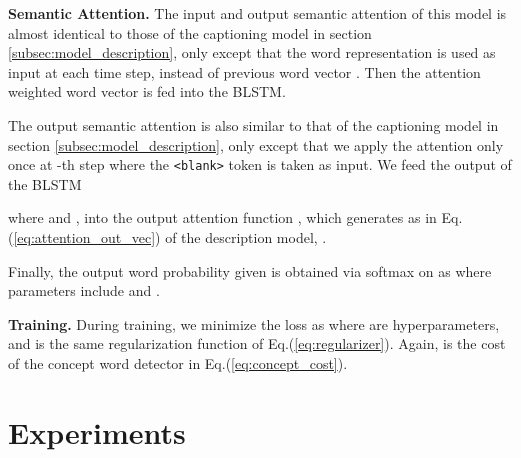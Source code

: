 \documentclass[10pt,twocolumn,letterpaper]{article}
\theoremstyle{nonumberplain}
\begin{document}
\textbf{Semantic Attention.}
The input and output semantic attention of this model is almost identical to those of the captioning model in section \ref{subsec:model_description},
only except that the word representation  is used as input  at each time step, instead of previous word vector . Then the attention weighted word vector  is fed into the BLSTM. 

The output semantic attention is also similar to that of the captioning model in section \ref{subsec:model_description},
only except that we apply the attention only once at -th step where the \texttt{<blank>} token is taken as input.
We feed the output of the BLSTM

where  and ,
into the output attention function ,
which generates  as in Eq.(\ref{eq:attention_out_vec}) of the description model,
.


Finally, the output word probability  given  is obtained via
softmax on  as
where parameters include  and .


\textbf{Training.}
During training, we minimize the loss  as
where  are hyperparameters, and  is the same regularization function of Eq.(\ref{eq:regularizer}).
Again,  is the cost of the concept word detector in Eq.(\ref{eq:concept_cost}).



\section{Experiments}
\label{sec:experiments}
\end{document}
